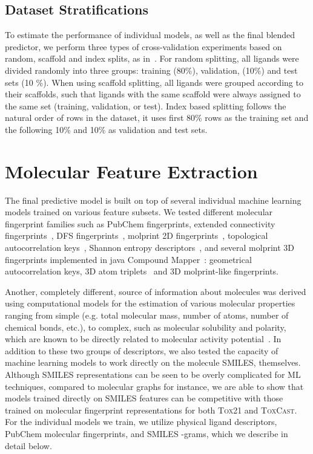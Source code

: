 \documentclass[11pt,a4paper]{article}
\begin{document}
\subsection{Dataset Stratifications}
\label{sec:splits}
To estimate the performance of individual models, as well as the final 
blended predictor, we perform three types of cross-validation experiments based
on random, scaffold and index splits, as in~\cite{Wu:2017}.
For random splitting, all ligands were divided randomly into three groups: 
training (80\%), validation, (10\%) and test sets (10 \%). 
When using scaffold splitting, all ligands were grouped according to their
scaffolds, such that ligands with the same scaffold were always assigned to 
the same set (training, validation, or test). Index based splitting follows the natural order of rows in the
dataset, it uses first 80\% rows as the training set and the following 10\% and 10\% as
validation and test sets.  


\section{Molecular Feature Extraction}
\label{sec:features}
The final predictive model is built on top of several individual machine
learning models trained on various feature subsets. We tested different 
molecular fingerprint families such as PubChem fingerprints, 
extended connectivity fingerprints~\cite{Rogers:2010aa}, 
DFS fingerprints~\cite{Ralaivola:2005aa},
molprint 2D fingerprints~\cite{Bender:2005aa}, 
topological autocorrelation keys~\cite{Schneider:1999aa}, 
Shannon entropy descriptors~\cite{Gregori-Puigjane:2006aa}, 
and several molprint 3D fingerprints implemented in 
java Compound Mapper~\cite{Hinselmann:2011aa}: geometrical autocorrelation keys, 
3D atom triplets~\cite{Mahe:2006aa} and 3D molprint-like fingerprints. 

Another, completely different,
source of information about molecules was derived using computational
models for the estimation of various molecular properties ranging from simple 
(e.g. total molecular mass, number of atoms, number of chemical bonds, etc.), 
to complex, such as molecular solubility and polarity, which are 
known to be
directly related to molecular activity potential~\cite{Alsenz:2007aa}. In addition to these
two groups of descriptors, we also tested the capacity of machine learning
models to work directly on the molecule SMILES, themselves. Although SMILES
representations can be seen to be overly complicated for ML techniques, compared to
molecular graphs for instance, 
we are able to show that models trained directly on SMILES features can be competitive
with those trained on molecular fingerprint representations for both 
\textsc{Tox21} and \textsc{ToxCast}. For the individual models we train, we 
utilize physical ligand descriptors, PubChem molecular fingerprints, and 
SMILES -grams, which we describe in detail below.
\end{document}
